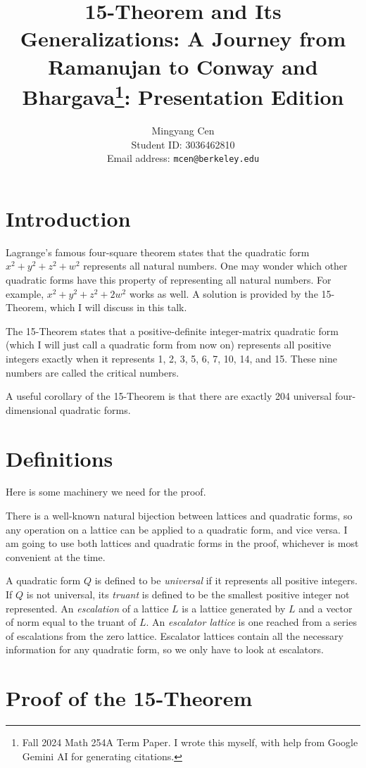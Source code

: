 \documentclass[letterpaper, 12pt]{article}
\title{15-Theorem and Its Generalizations: A Journey from Ramanujan to Conway and Bhargava\footnote{Fall 2024 Math 254A Term Paper. I wrote this myself, with help from Google Gemini AI for generating citations.}: Presentation Edition}
\author{Mingyang Cen \\ Student ID: 3036462810 \\ Email address: \texttt{mcen@berkeley.edu}}
\begin{document}
\maketitle

\section{Introduction}
Lagrange's famous four-square theorem states that the quadratic form $x^2+y^2+z^2+w^2$ represents all natural numbers. One may wonder which other quadratic forms have this property of representing all natural numbers. For example, $x^2 + y^2 + z^2 + 2w^2$ works as well. A solution is provided by the 15-Theorem, which I will discuss in this talk.

The 15-Theorem states that a positive-definite integer-matrix quadratic form (which I will just call a quadratic form from now on) represents all positive integers exactly when it represents 1, 2, 3, 5, 6, 7, 10, 14, and 15. These nine numbers are called the critical numbers.

A useful corollary of the 15-Theorem is that there are exactly 204 universal four-dimensional quadratic forms.

\section{Definitions}
Here is some machinery we need for the proof.

There is a well-known natural bijection between lattices and quadratic forms, so any operation on a lattice can be applied to a quadratic form, and vice versa. I am going to use both lattices and quadratic forms in the proof, whichever is most convenient at the time.

A quadratic form $Q$ is defined to be \emph{universal} if it represents all positive integers. If $Q$ is not universal, its \emph{truant} is defined to be the smallest positive integer not represented. An \emph{escalation} of a lattice $L$ is a lattice generated by $L$ and a vector of norm equal to the truant of $L$. An \emph{escalator lattice} is one reached from a series of escalations from the zero lattice. Escalator lattices contain all the necessary information for any quadratic form, so we only have to look at escalators.

\section{Proof of the 15-Theorem}
\end{document}
